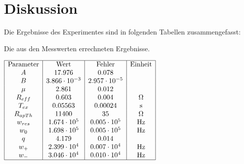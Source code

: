 \section{Diskussion}
\label{sec:Diskussion}
Die Ergebnisse des Experimentes sind in folgenden Tabellen zusammengefasst:

\begin{table}[H]
  \centering
    \caption{Die aus den Messwerten errechneten Ergebnisse.}
    \label{tab:ergdisk}
    $\begin{array}{|c|c|c|c|}
      \hline
      \text{Parameter} & \text{Wert} & \text{Fehler}  & \text{Einheit} \\
      A         &  17.976               &   0.078                &               \\
      B         &  3.866 \cdot 10^{-3}  &   2.957 \cdot 10^{-5}  &               \\
      \mu       &  2.861                &   0.012                &               \\
      R_{eff}   &  0.603                &   0.004                &  \si{\ohm}    \\
      T_{ex}    &  0.05563              &   0.00024              &  \si{\second} \\
      R_{apTh}  &  11400                &   35                   &  \si{\ohm}     \\
      w_{res}   &  1.674 \cdot 10^5     &   0.005 \cdot 10^5     &  \si{\hertz}   \\
      w_0       &  1.698 \cdot 10^5     &   0.005 \cdot 10^5     &  \si{\hertz}   \\
      q         &  4.179                &   0.014                &                \\
      w_{+}     &  2.399 \cdot 10^4     &   0.007 \cdot 10^4     &  \si{\hertz}   \\
      w_{-}     &  3.046 \cdot 10^4     &   0.010 \cdot 10^4     &  \si{\hertz}   \\
      \hline
    \end{array}$
\end{table}

